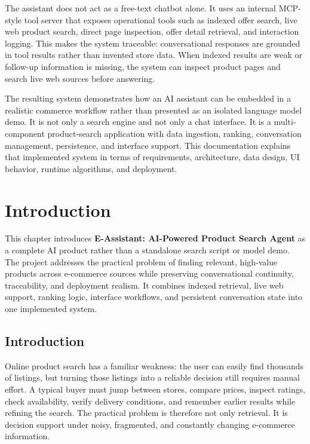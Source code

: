 \documentclass[12pt,a4paper,oneside]{report}
\newcommand{\projecttitle}{E-Assistant: AI-Powered Product Search Agent}
\begin{document}
The assistant does not act as a free-text chatbot alone. It uses an internal MCP-style tool server that exposes operational tools such as indexed offer search, live web product search, direct page inspection, offer detail retrieval, and interaction logging. This makes the system traceable: conversational responses are grounded in tool results rather than invented store data. When indexed results are weak or follow-up information is missing, the system can inspect product pages and search live web sources before answering.

The resulting system demonstrates how an AI assistant can be embedded in a realistic commerce workflow rather than presented as an isolated language model demo. It is not only a search engine and not only a chat interface. It is a multi-component product-search application with data ingestion, ranking, conversation management, persistence, and interface support. This documentation explains that implemented system in terms of requirements, architecture, data design, UI behavior, runtime algorithms, and deployment.

\tableofcontents
\listoffigures
\listoftables

\clearpage
{}

\chapter{Introduction}

This chapter introduces \textbf{\projecttitle} as a complete AI product rather than a standalone search script or model demo. The project addresses the practical problem of finding relevant, high-value products across e-commerce sources while preserving conversational continuity, traceability, and deployment realism. It combines indexed retrieval, live web support, ranking logic, interface workflows, and persistent conversation state into one implemented system.

\section{Introduction}
Online product search has a familiar weakness: the user can easily find thousands of listings, but turning those listings into a reliable decision still requires manual effort. A typical buyer must jump between stores, compare prices, inspect ratings, check availability, verify delivery conditions, and remember earlier results while refining the search. The practical problem is therefore not only retrieval. It is decision support under noisy, fragmented, and constantly changing e-commerce information.
\end{document}
